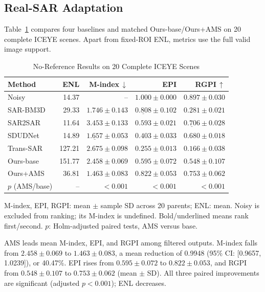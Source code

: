 \documentclass[journal]{IEEEtran}
\newcommand{\rev}[1]{{\color{RevisionBlue}#1}}
\newcommand{\rev}[1]{#1}
\begin{document}
\subsection{Real-SAR Adaptation}
\rev{Table~\ref{tab:real} compares four baselines and matched Ours-base/Ours+AMS on 20 complete ICEYE scenes. Apart from fixed-ROI ENL, metrics use the full valid image support.}

\begin{table}[!t]
\caption{\rev{No-Reference Results on 20 Complete ICEYE Scenes}}
\label{tab:real}
\centering
\footnotesize
\setlength{\tabcolsep}{1.1pt}
\renewcommand{\arraystretch}{1.04}
\rev{\begin{tabular*}{\columnwidth}{@{\extracolsep{\fill}}lrrrr@{}}
\toprule
\textbf{Method} & \textbf{ENL} & \textbf{M-index}\,$\downarrow$ & \textbf{EPI} & \textbf{RGPI}\,$\uparrow$ \\
\midrule
Noisy & 14.37 & -- & \(1.000{\pm}0.000\) & \(0.897{\pm}0.030\) \\
SAR-BM3D & 29.33 & \(1.746{\pm}0.143\) & \(\underline{0.808}{\pm}0.102\) & \(0.281{\pm}0.021\) \\
SAR2SAR & 11.64 & \(3.453{\pm}0.133\) & \(0.593{\pm}0.021\) & \(\underline{0.706}{\pm}0.028\) \\
SDUDNet & 14.89 & \(\underline{1.657}{\pm}0.053\) & \(0.403{\pm}0.033\) & \(0.680{\pm}0.018\) \\
Trans-SAR & 127.21 & \(2.675{\pm}0.098\) & \(0.255{\pm}0.013\) & \(0.166{\pm}0.038\) \\
Ours-base & 151.77 & \(2.458{\pm}0.069\) & \(0.595{\pm}0.072\) & \(0.548{\pm}0.107\) \\
Ours+AMS & 36.81 & \(\mathbf{1.463}{\pm}0.083\) & \(\mathbf{0.822}{\pm}0.053\) & \(\mathbf{0.753}{\pm}0.062\) \\
\midrule
\(p\) (AMS/base) & -- & \(<0.001\) & \(<0.001\) & \(<0.001\) \\
\bottomrule
\end{tabular*}}
\vspace{1pt}
\parbox{\columnwidth}{\footnotesize\rev{M-index, EPI, RGPI: mean \(\pm\) sample SD across 20 parents; ENL: mean. Noisy is excluded from ranking; its M-index is undefined. Bold/underlined means rank first/second. \(p\): Holm-adjusted paired tests, AMS versus base.}}
\end{table}

\rev{AMS leads mean M-index, EPI, and RGPI among filtered outputs. M-index falls from \(2.458\pm0.069\) to \(1.463\pm0.083\), a mean reduction of 0.9948 (95\% CI: [0.9657, 1.0239]), or 40.47\%. EPI rises from \(0.595\pm0.072\) to \(0.822\pm0.053\), and RGPI from \(0.548\pm0.107\) to \(0.753\pm0.062\) (mean \(\pm\) SD). All three paired improvements are significant (adjusted \(p<0.001\)); ENL decreases.}
\end{document}
